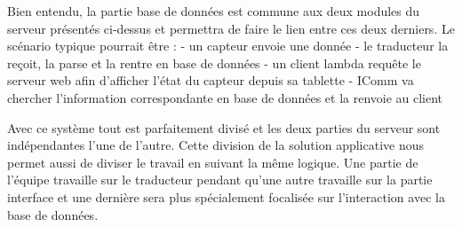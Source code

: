 Bien entendu, la partie base de données est commune aux deux modules du serveur présentés ci-dessus et permettra de faire le lien entre ces deux derniers. Le scénario typique pourrait être :
- un capteur envoie une donnée
- le traducteur la reçoit, la parse et la rentre en base de données
- un client lambda requête le serveur web afin d'afficher l'état du capteur depuis sa tablette
- IComm va chercher l'information correspondante en base de données et la renvoie au client

Avec ce système tout est parfaitement divisé et les deux parties du serveur sont indépendantes l'une de l'autre. Cette division de la solution applicative nous permet aussi de diviser le travail en suivant la même logique. Une partie de l'équipe travaille sur le traducteur pendant qu'une autre travaille sur la partie interface et une dernière sera plus spécialement focalisée sur l'interaction avec la base de données.